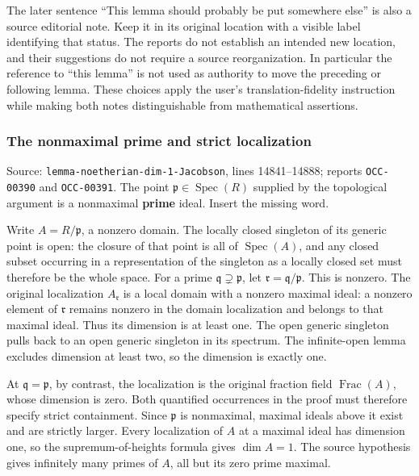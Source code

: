The later sentence ``This lemma should probably be put somewhere else'' is also a source editorial note. Keep it in its original location with a visible label identifying that status. The reports do not establish an intended new location, and their suggestions do not require a source reorganization. In particular the reference to ``this lemma'' is not used as authority to move the preceding or following lemma. These choices apply the user's translation-fidelity instruction while making both notes distinguishable from mathematical assertions.

\subsubsection{The nonmaximal prime and strict localization}\label{algebra-proof-004-the-nonmaximal-prime-and-strict-localization}

Source: \texttt{lemma-noetherian-dim-1-Jacobson}, lines 14841--14888; reports \texttt{OCC-00390} and \texttt{OCC-00391}. The point \(\mathfrak p\in\operatorname{Spec}(R)\) supplied by the topological argument is a nonmaximal \textbf{prime} ideal. Insert the missing word.

Write \(A=R/\mathfrak p\), a nonzero domain. The locally closed singleton of its generic point is open: the closure of that point is all of \(\operatorname{Spec}(A)\), and any closed subset occurring in a representation of the singleton as a locally closed set must therefore be the whole space. For a prime \(\mathfrak q\supsetneq\mathfrak p\), let \(\mathfrak r=\mathfrak q/\mathfrak p\). This is nonzero. The original localization \(A_{\mathfrak r}\) is a local domain with a nonzero maximal ideal: a nonzero element of \(\mathfrak r\) remains nonzero in the domain localization and belongs to that maximal ideal. Thus its dimension is at least one. The open generic singleton pulls back to an open generic singleton in its spectrum. The infinite-open lemma excludes dimension at least two, so the dimension is exactly one.

At \(\mathfrak q=\mathfrak p\), by contrast, the localization is the original fraction field \(\operatorname{Frac}(A)\), whose dimension is zero. Both quantified occurrences in the proof must therefore specify strict containment. Since \(\mathfrak p\) is nonmaximal, maximal ideals above it exist and are strictly larger. Every localization of \(A\) at a maximal ideal has dimension one, so the supremum-of-heights formula gives \(\dim A=1\). The source hypothesis gives infinitely many primes of \(A\), all but its zero prime maximal.

